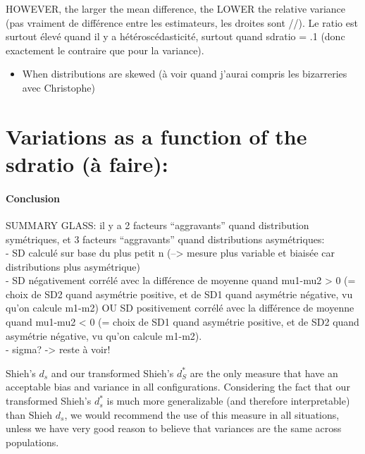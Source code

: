 \documentclass[
  man,floatsintext]{apa6}
\providecommand{\tightlist}{%
  \setlength{\itemsep}{0pt}\setlength{\parskip}{0pt}}
\begin{document}
HOWEVER, the larger the mean difference, the LOWER the relative variance (pas vraiment de différence entre les estimateurs, les droites sont //). Le ratio est surtout élevé quand il y a hétéroscédasticité, surtout quand sdratio = .1 (donc exactement le contraire que pour la variance).

\begin{itemize}
\tightlist
\item
  When distributions are skewed (à voir quand j'aurai compris les bizarreries avec Christophe)
\end{itemize}

\hypertarget{variations-as-a-function-of-the-sdratio-uxe0-faire}{%
\section{Variations as a function of the sdratio (à faire):}\label{variations-as-a-function-of-the-sdratio-uxe0-faire}}

\hypertarget{conclusion}{%
\paragraph{Conclusion}\label{conclusion}}

SUMMARY GLASS: il y a 2 facteurs \enquote{aggravants} quand distribution symétriques, et 3 facteurs \enquote{aggravants} quand distributions asymétriques:\\
- SD calculé sur base du plus petit n (--\textgreater{} mesure plus variable et biaisée car distributions plus asymétrique)\\
- SD négativement corrélé avec la différence de moyenne quand mu1-mu2 \textgreater{} 0 (= choix de SD2 quand asymétrie positive, et de SD1 quand asymétrie négative, vu qu'on calcule m1-m2) OU SD positivement corrélé avec la différence de moyenne quand mu1-mu2 \textless{} 0 (= choix de SD1 quand asymétrie positive, et de SD2 quand asymétrie négative, vu qu'on calcule m1-m2).\\
- sigma? -\textgreater{} reste à voir!

Shieh's \(d_s\) and our transformed Shieh's \(d^*_S\) are the only measure that have an acceptable bias and variance in all configurations. Considering the fact that our transformed Shieh's \(d^*_s\) is much more generalizable (and therefore interpretable) than Shieh \(d_s\), we would recommend the use of this measure in all situations, unless we have very good reason to believe that variances are the same across populations.
\end{document}
